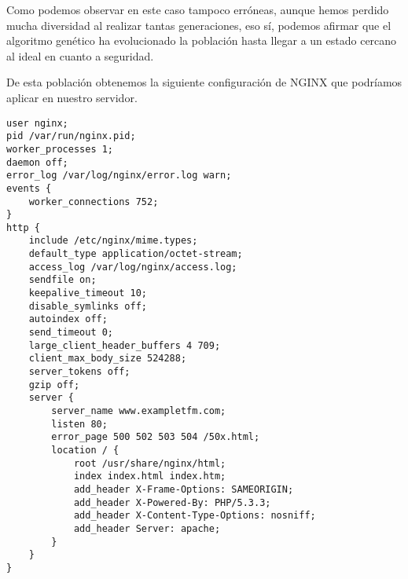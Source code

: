 Como podemos observar en este caso tampoco erróneas, aunque hemos perdido mucha diversidad al realizar tantas generaciones, eso sí, podemos afirmar que el algoritmo genético ha evolucionado la población hasta llegar a un estado cercano al ideal en cuanto a seguridad.

\bigskip
De esta población obtenemos la siguiente configuración de NGINX que podríamos aplicar en nuestro servidor.

\begin{lstlisting}[label={lst:nginx_config_random},caption={Configuración de NGINX tras 30 generaciones}]
user nginx;
pid /var/run/nginx.pid;
worker_processes 1;
daemon off;
error_log /var/log/nginx/error.log warn;
events {
    worker_connections 752;
}
http {
    include /etc/nginx/mime.types;
    default_type application/octet-stream;
    access_log /var/log/nginx/access.log;
    sendfile on;
    keepalive_timeout 10;
    disable_symlinks off;
    autoindex off;
    send_timeout 0;
    large_client_header_buffers 4 709;
    client_max_body_size 524288;
    server_tokens off;
    gzip off;
    server {
        server_name www.exampletfm.com;
        listen 80;
        error_page 500 502 503 504 /50x.html;
        location / {
            root /usr/share/nginx/html;
            index index.html index.htm;
            add_header X-Frame-Options: SAMEORIGIN;
            add_header X-Powered-By: PHP/5.3.3;
            add_header X-Content-Type-Options: nosniff;
            add_header Server: apache;
        }
    }
}
\end{lstlisting}

